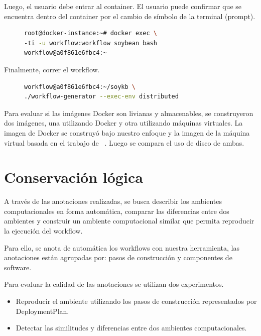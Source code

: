 Luego, el usuario debe entrar al container. El usuario puede confirmar que se encuentra dentro del container por el cambio de símbolo de la terminal  (prompt).
\begin{figure}[ht]
\begin{lstlisting}[caption={Entrar al ambiente computacional utilizando bash},label={lst:2},language=bash]
root@docker-instance:~# docker exec \
-ti -u workflow:workflow soybean bash
workflow@a0f861e6fbc4:~ 
\end{lstlisting}
\end{figure}

Finalmente, correr el workflow. 

\begin{figure}[ht]
\begin{lstlisting}[caption={Run the workflow},label={lst:3},language=bash]
workflow@a0f861e6fbc4:~/soykb \
./workflow-generator --exec-env distributed	
\end{lstlisting}
\end{figure}

Para evaluar si las imágenes Docker son livianas y almacenables, se construyeron dos imágenes, una utilizando Docker y otra utilizando máquinas virtuales. La imagen de Docker se construyó bajo nuestro enfoque y la imagen de la máquina virtual basada en el trabajo de ~\cite{santana2017reproducibility}. Luego se compara el uso de disco de ambas.

\section{Conservación lógica}\label{s5.3}

A través de las anotaciones realizadas, se busca describir los ambientes computacionales en forma automática, comparar las diferencias entre dos ambientes y construir un ambiente computacional similar que permita reproducir la ejecución del workflow. 

Para ello, se anota de automática los workflows con nuestra herramienta, las anotaciones están agrupadas por: pasos de construcción y componentes de software. 

Para evaluar la calidad de las anotaciones se utilizan dos experimentos.

\begin{itemize}
	\item Reproducir el ambiente utilizando los pasos de construcción representados por DeploymentPlan.
	\item Detectar las similitudes y diferencias entre dos ambientes computacionales.
\end{itemize}

